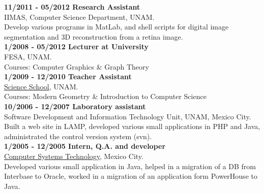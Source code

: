 \documentclass[letterpaper,10pt]{article}
\begin{document}
\begin{minipage}{0.5\textwidth}
\textbf{11/2011 - 05/2012 Research Assistant} \\
IIMAS, Computer Science Department, UNAM. \\
Develop various programs in MatLab, and shell scripts for digital image segmentation and 3D reconstruction from a retina image. \\

\textbf{1/2008 - 05/2012 Lecturer at University} \\
FESA, UNAM. \\
Courses: Computer Graphics \& Graph Theory \\

\textbf{1/2009 - 12/2010 Teacher Assistant} \\
\href{http://www.fciencias.unam.mx/}{Science School}, UNAM. \\
Courses: Modern Geometry \& Introduction to Computer Science \\

\textbf{10/2006 - 12/2007 Laboratory assistant} \\
Software Development and Information Technology Unit, UNAM, Mexico City. \\
Built a web site in LAMP, developed various small applications in PHP and Java, administrated the control version system (svn). \\

\textbf{1/2005 - 12/2005 Intern, Q.A. and developer} \\
\href{http://www.tsc.com.mx/}{Computer Systems Technology}, Mexico City. \\
Developed various small application in Java, helped in a migration of a DB from Interbase to Oracle, worked in a migration of an application form PowerHouse to Java. \\

\end{minipage}
%
\hspace{0.05\textwidth}
%
\end{document}
